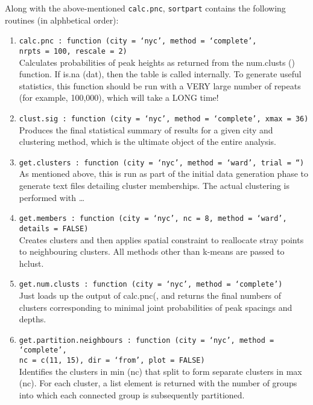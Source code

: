\documentclass[a4paper,oneside]{article}
\begin{document}
Along with the above-mentioned {\tt calc.pnc}, {\tt sortpart} contains the following routines (in alphbetical order):\\
\begin{enumerate}
    \item {\tt calc.pnc : function (city = `nyc', method = `complete',\\ nrpts = 100, rescale = 2)}\\ Calculates probabilities of peak heights as
            returned from the num.clusts () function.  If is.na (dat), then the table is called internally. To generate useful statistics, this
            function should be run with a VERY large number of repeats (for example, 100,000), which will take a LONG time!
    \item {\tt clust.sig : function (city = `nyc', method = `complete', xmax = 36)}\\ Produces the final statistical summary of results for
        a given city and clustering method, which is the ultimate object of the entire analysis.
    \item {\tt get.clusters : function (city = `nyc', method = `ward', trial = ``)}\\
        As mentioned above, this is run as part of the initial data generation phase to generate text files detailing cluster memberships. The
        actual clustering is performed with \ldots
    \item {\tt get.members : function (city = `nyc', nc = 8, method = `ward', details = FALSE)}\\
        Creates clusters and then applies spatial constraint to reallocate stray points to neighbouring clusters.  All methods other than
        k-means are passed to hclust.
    \item {\tt get.num.clusts : function (city = `nyc', method = `complete')}\\
        Just loads up the output of calc.pnc(, and returns the final numbers of clusters corresponding to minimal joint probabilities of peak
        spacings and depths.  
    \item {\tt get.partition.neighbours : function (city = `nyc', method = `complete',\\
        nc = c(11, 15), dir = `from', plot = FALSE)}\\ 
        Identifies the clusters in min (nc) that split to form separate clusters in max (nc). For each cluster, a list element is returned with
        the number of groups into which each connected group is subsequently partitioned.

\end{enumerate}
\end{document}
